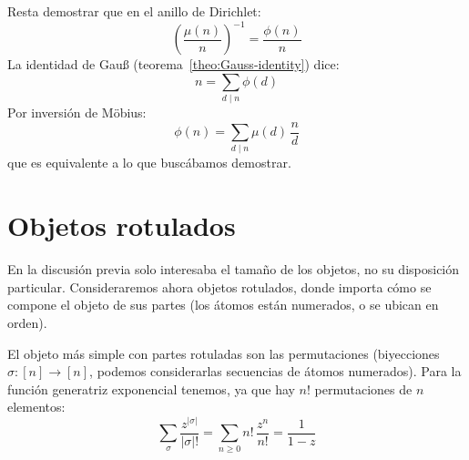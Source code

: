   Resta demostrar que en el anillo de Dirichlet:%
  \begin{equation*}
    \left( \frac{\mu(n)}{n} \right)^{-1}
      = \frac{\phi(n)}{n}
  \end{equation*}
  La identidad de Gauß%
  (teorema~\ref{theo:Gauss-identity}) dice:
  \begin{equation*}
    n = \sum_{d \mid n} \phi(d)
  \end{equation*}
  Por inversión de Möbius:%
  \begin{equation*}
    \phi(n)
      = \sum_{d \mid n} \mu(d) \, \frac{n}{d}
  \end{equation*}
  que es equivalente a lo que buscábamos demostrar.



\section{Objetos rotulados}
\label{sec:rotulados}

  En la discusión previa solo interesaba el tamaño de los objetos,
  no su disposición particular.
  Consideraremos ahora objetos rotulados,
  donde importa cómo se compone el objeto de sus partes
  (los átomos están numerados,
   o se ubican en orden).

  El objeto más simple con partes rotuladas son las permutaciones
  (biyecciones \(\sigma \colon [n] \rightarrow [n]\),
   podemos considerarlas secuencias de átomos numerados).
  Para la función generatriz exponencial tenemos,
  ya que hay \(n!\) permutaciones de \(n\) elementos:
  \begin{equation*}
    \sum_{\sigma}
	\frac{z^{\lvert \sigma \rvert}}{\lvert \sigma \rvert !}
      = \sum_{n \ge 0} n! \, \frac{z^n}{n!}
      = \frac{1}{1 - z}
  \end{equation*}


